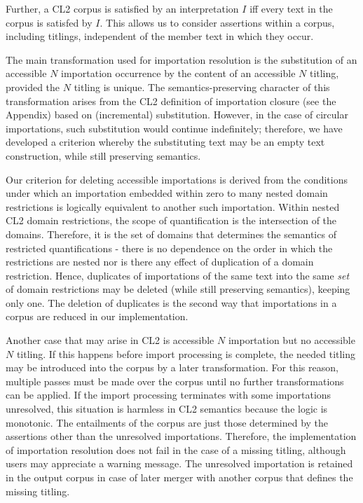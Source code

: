 \documentclass{IOS-Book-Article}
\begin{document}
{%
Further, a CL2 corpus is satisfied by an interpretation $I$ iff every text in the corpus is satisfed by $I$. This allows us to consider assertions within a corpus, including titlings, independent of the member text in which they occur.

The main transformation used for importation resolution is the substitution of an accessible $N$ importation occurrence by the content of an accessible $N$ titling, provided the $N$ titling is unique. The semantics-preserving character of this transformation arises from the CL2 definition of importation closure (see the Appendix) based on (incremental) substitution.
However, in the case of circular importations, such substitution would continue indefinitely; therefore, we have developed a criterion whereby the substituting text may be an empty text construction, while still preserving semantics.

Our criterion for deleting accessible importations is derived from the conditions under which an importation embedded within zero to many nested domain restrictions is logically equivalent to another such importation.
Within nested CL2 domain restrictions, the scope of quantification is the intersection of the domains.
Therefore, it is the set of domains that determines the semantics of restricted quantifications - 
there is no dependence on the order in which the restrictions are nested nor is there any effect of duplication of a domain restriction. 
Hence, duplicates of importations of the same text into the same \emph{set} of domain restrictions may be deleted (while still preserving semantics), keeping only one.  
The deletion of duplicates is the second way that importations in a corpus are reduced in our implementation.

Another case that may arise in CL2 is accessible $N$ importation but no accessible $N$ titling. 
If this happens before import processing is complete, the needed titling may be introduced into the corpus by a later transformation.
For this reason, multiple passes must be made over the corpus until no further transformations can be applied. 
If the import processing terminates with some importations unresolved, this situation is harmless in CL2 semantics because the logic is monotonic.
The entailments of the corpus are just those determined by the assertions other than the unresolved importations.
Therefore, the implementation of importation resolution does not fail in the case of a missing titling, although users may appreciate a warning message.
The unresolved importation is retained in the output corpus in case of later merger with another corpus that defines the missing titling.

}
\end{document}
